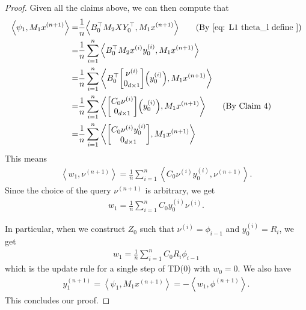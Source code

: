 \documentclass{article}
\newcommand{\explain}[1]{\tag*{(#1)}}
\newcommand{\indot}[2]{{\left<#1, #2\right>}}
\begin{document}
\begin{proof}
    Given all the claims above,
    we can then compute that
    \begin{align}
        \indot{\psi_{1}}{M_1 x^{(n+1)}} =& \frac{1}{n}\indot{B_0^\top M_2 X Y_0^\top}{M_1 x^{(n+1)}} \explain{By~\eqref{eq: L1 theta_l define }}\\
        =& \frac{1}{n}\sum_{i=1}^n \indot{B_0^\top M_2 x^{(i)} y_0^{(i)}}{M_1 x^{(n+1)}}\\
        =& \frac{1}{n} \sum_{i=1}^n 
        \indot{B_0^\top \mqty[\nu^{(i)} \\0_{d\times 1}] 
        \qty(y_0^{(i)})}{M_1 x^{(n+1)}}\\
        =& 
        \frac{1}{n} \sum_{i=1}^n 
        \indot{\mqty[C_0 \nu^{(i)}\\0_{d\times 1}] 
        \qty( y_0^{(i)} )}{M_1 x^{(n+1)}} \explain{By Claim 4}\\
        =& 
        \frac{1}{n} \sum_{i=1}^n 
        \indot{\mqty[C_0 \nu^{(i)} y_0^{(i)}\\0_{d\times 1}]}
        {M_1 x^{(n+1)}}\\
    \end{align}
    This means
    \begin{align}
        \indot{w_{1}}{\nu^{(n+1)}} 
        = \frac{1}{n} \sum_{i=1}^n 
        \indot{C_0 \nu^{(i)} y_0^{(i)}}{
        \nu^{(n+1)}}.
    \end{align}
    Since the choice of the query $\nu^{(n+1)}$ is arbitrary, we get 
    \begin{align}
        w_{1} = \frac{1}{n}\sum_{i=1}^n C_0 y_0^{(i)} \nu^{(i)}.
    \end{align}

    In particular, when we construct $Z_0$ such that $\nu^{(i)} = \phi_{i-1}$ and $y_0^{(i)} = R_i$, 
    we get
    \begin{align}
        w_1 = \frac{1}{n}\sum_{i=1}^n C_0 R_i \phi_{i-1}
    \end{align}
    which is the update rule for a single step of TD(0) with $w_0 = 0$.
    We also have
    \begin{align}
        y_1^{(n+1)}
        = \indot{\psi_1}{M_1 x^{(n+1)}} 
        = -\indot{w_1}{\phi^{(n+1)}}.
    \end{align}
    This concludes our proof.
    \end{proof}
\end{document}
